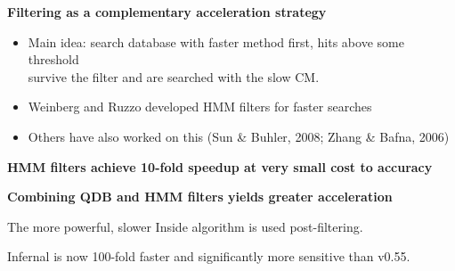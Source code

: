 \documentclass[landscape]{slides}
\begin{document}
\begin{slide}
\vfill

\end{slide}
\begin{slide}

\begin{center}
\textbf{Filtering as a complementary acceleration strategy}
\end{center}

\small
\begin{itemize}
\item
  Main idea: search database with faster method first, hits above some threshold \\ survive the filter and are searched with the slow CM.
\item
  Weinberg and Ruzzo developed HMM filters for faster searches
\item
  Others have also worked on this (Sun \& Buhler, 2008; Zhang \&
  Bafna, 2006)
\end{itemize}

\vfill

\end{slide}
\begin{slide}

\begin{center}
\textbf{HMM filters achieve 10-fold speedup at very small cost to accuracy}
\end{center}


\vfill

\end{slide}
\begin{slide}

\begin{center}
\normalsize
\textbf{Combining QDB and HMM filters yields greater acceleration}

\small
%
The more powerful, slower Inside algorithm is used post-filtering.

Infernal is now 100-fold faster and significantly more sensitive than v0.55.
%

\end{center}


\vfill

\end{slide}
\end{document}
